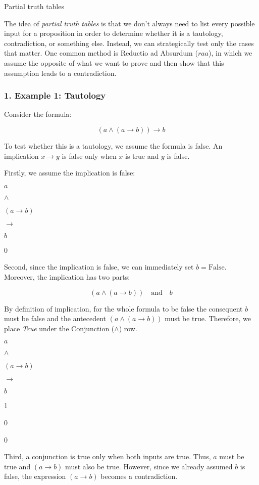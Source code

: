 Partial truth tables

The idea of \emph{partial truth tables} is that we don't always need to
list every possible input for a proposition in order to determine
whether it is a tautology, contradiction, or something else. Instead, we
can strategically test only the cases that matter. One common method is
Reductio ad Absurdum (\(raa\)), in which we assume the opposite of what
we want to prove and then show that this assumption leads to a
contradiction.

\subsubsection{1. Example 1: Tautology}\label{example-1-tautology}

Consider the formula:

\[ (a \land (a \rightarrow b)) \rightarrow b \]

To test whether this is a tautology, we assume the formula is false. An
implication \(x \rightarrow y\) is false only when \(x\) is true and
\(y\) is false.

Firstly, we assume the implication is false:

\(a\)

\(\land\)

\((a \rightarrow b)\)

\(\rightarrow\)

\(b\)

0

Second, since the implication is false, we can immediately set
\(b = \text{False}\). Moreover, the implication has two parts:

\[ (a \land (a \rightarrow b)) \quad \text{and} \quad b \]

By definition of implication, for the whole formula to be false the
consequent \(b\) must be false and the antecedent
\((a \land (a \rightarrow b))\) must be true. Therefore, we place
\emph{True} under the Conjunction (\(\land\)) row.

\(a\)

\(\land\)

\((a \rightarrow b)\)

\(\rightarrow\)

\(b\)

1

0

0

Third, a conjunction is true only when both inputs are true. Thus, \(a\)
must be true and \((a \rightarrow b)\) must also be true. However, since
we already assumed \(b\) is false, the expression \((a \rightarrow b)\)
becomes a contradiction.

